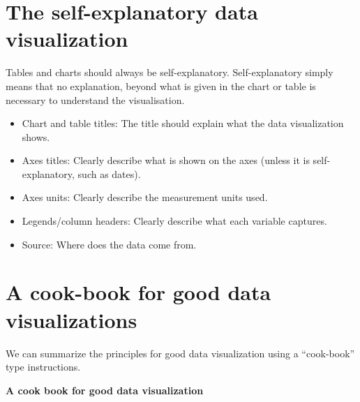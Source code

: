 \documentclass[]{book}
\providecommand{\tightlist}{%
  \setlength{\itemsep}{0pt}\setlength{\parskip}{0pt}}
\begin{document}
\hypertarget{the-self-explanatory-data-visualization}{%
\section{The self-explanatory data visualization}\label{the-self-explanatory-data-visualization}}

Tables and charts should always be self-explanatory. Self-explanatory simply means that no explanation, beyond what is given in the chart or table is necessary to understand the visualisation.

\begin{itemize}
\tightlist
\item
  Chart and table titles: The title should explain what the data visualization shows.
\item
  Axes titles: Clearly describe what is shown on the axes (unless it is self-explanatory, such as dates).
\item
  Axes units: Clearly describe the measurement units used.
\item
  Legends/column headers: Clearly describe what each variable captures.
\item
  Source: Where does the data come from.
\end{itemize}

\hypertarget{a-cook-book-for-good-data-visualizations}{%
\section{A cook-book for good data visualizations}\label{a-cook-book-for-good-data-visualizations}}

We can summarize the principles for good data visualization using a ``cook-book'' type instructions.

\textbf{A cook book for good data visualization}
\end{document}
